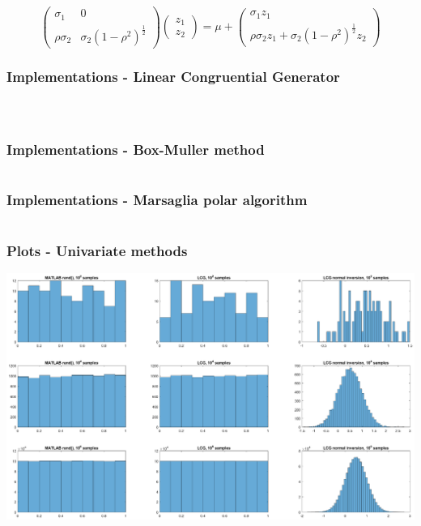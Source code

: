 \documentclass[10pt, serif, mathserif]{beamer}
\begin{document}
\begin{frame}
\begin{enumerate}
\[          \left(\begin{matrix} \sigma_1 & 0 \\ \rho\sigma_2 & \sigma_2(1-\rho^2)^{\frac{1}{2}} \end{matrix} \right)
          \left(\begin{matrix} z_1 \\ z_2 \end{matrix} \right) =
        \mu + %
          \left(\begin{matrix} \sigma_1 z_1 \\ \rho\sigma_2z_1+\sigma_2(1-\rho^2)^\frac{1}{2}z_2 \end{matrix} \right)
      \]
  \end{enumerate}
\end{frame}

\begin{frame}
	\frametitle{Implementations - Linear Congruential Generator}
	\begin{columns}[t]
		\begin{column}{5cm}
      \inputminted[fontsize=\small,linenos]{matlab}{matlab/lcg.m}
		\end{column}
		\begin{column}{5cm}
      \inputminted[fontsize=\small,linenos,firstnumber=14]{matlab}{matlab/lcgstep.m}
		\end{column}
	\end{columns}
\end{frame}

\begin{frame}
	\frametitle{Implementations - Box-Muller method}
  \inputminted[fontsize=\small,linenos]{matlab}{matlab/boxmuller.m}
\end{frame}

\begin{frame}
	\frametitle{Implementations - Marsaglia polar algorithm}
  \inputminted[fontsize=\small,linenos]{matlab}{matlab/marsaglia.m}
\end{frame}

\begin{frame}
	\frametitle{Plots - Univariate methods}
	\includegraphics[width=\textwidth, trim=70mm 80mm 70mm 20mm]{../univariate.eps}
\end{frame}
\end{document}
